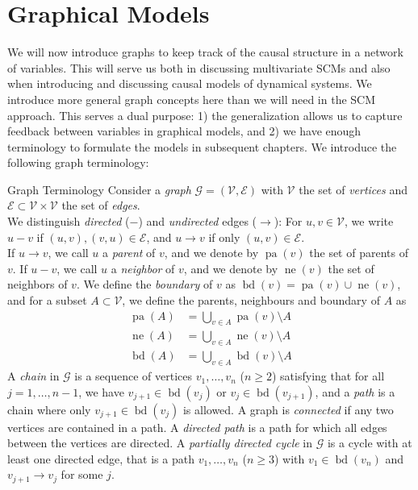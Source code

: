 \documentclass[11pt, a4paper]{memoir}
\theoremstyle{break}
\theoremstyle{break}
\theoremstyle{nonumberplain}
\DeclareMathOperator{\pa}{pa}
\DeclareMathOperator{\nei}{ne}
\DeclareMathOperator{\bd}{bd}
\begin{document}
\section{Graphical Models}\label{graphmod}
We will now introduce graphs to keep track of the causal structure in a network of variables. This will serve us both in discussing multivariate SCMs and also when introducing and discussing causal models of dynamical systems. We introduce more general graph concepts here than we will need in the SCM approach. This serves a dual purpose: 1) the generalization allows us to capture feedback between variables in graphical models, and 2) we have enough terminology to formulate the models in subsequent chapters. We introduce the following graph terminology:
\begin{mydefinition}{Graph Terminology}
Consider a \emph{graph} $\mathcal{G}=(\mathcal{V},\mathcal{E})$ with $\mathcal{V}$ the set of \emph{vertices} and $\mathcal{E}\subset \mathcal{V}\times \mathcal{V}$ the set of \emph{edges}.\\[5pt]
We distinguish \textit{directed} ($-$) and \textit{undirected} edges ($\to$): For $u,v\in \mathcal{V}$, we write $u-v$ if $(u,v),(v,u)\in \mathcal{E}$, and $u\to v$ if only $(u,v)\in \mathcal{E}$. \\[5pt]
If $u\to v$, we call $u$ a \emph{parent} of $v$, and we denote by $\pa(v)$ the set of parents of $v$. If $u-v$, we call $u$ a \emph{neighbor} of $v$, and we denote by $\nei(v)$ the set of neighbors of $v$. We define the \emph{boundary} of $v$ as $\bd(v)=\pa(v)\cup \nei(v)$, and for a subset $A\subset \mathcal{V}$, we define the parents, neighbours and boundary of $A$ as
\begin{align*}
\pa(A)&=\bigcup_{v\in A}\pa(v)\setminus A\\
 \nei(A)&=\bigcup_{v\in A}\nei(v)\setminus A\\
 \bd(A)&=\bigcup_{v\in A}\bd(v)\setminus A
\end{align*}
A \emph{chain} in $\mathcal{G}$ is a sequence of vertices $v_1,\ldots, v_n$ ($n \geqslant 2$) satisfying that for all $j=1,\ldots,n-1$, we have $v_{j+1}\in \bd(v_j)$ or $v_{j}\in \bd(v_{j+1})$, and a \emph{path} is a chain  where only $v_{j+1}\in \bd(v_j)$ is allowed. A graph is \emph{connected} if any two vertices are contained in a path. A \emph{directed path} is a path for which all edges between the vertices are directed. A \textit{partially directed cycle} in $\mathcal{G}$ is a cycle with at least one directed edge, that is a path $v_1,\ldots, v_n$ ($n \geqslant 3$) with $v_1\in \bd(v_n)$ and $v_{j+1}\to v_j$ for some $j$.\\[5pt]

\end{mydefinition}
\end{document}
